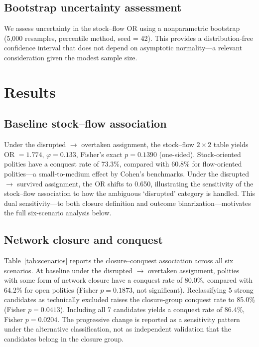 \documentclass[pdflatex,sn-basic]{sn-jnl}
\theoremstyle{thmstyleone}%
\theoremstyle{thmstyletwo}%
\theoremstyle{thmstylethree}%
\begin{document}
\subsection{Bootstrap uncertainty assessment}\label{sec:methods-bootstrap}

We assess uncertainty in the stock--flow OR using a nonparametric bootstrap (5{,}000 resamples, percentile method, seed = 42). This provides a distribution-free confidence interval that does not depend on asymptotic normality---a relevant consideration given the modest sample size.

\section{Results}\label{sec:results}

\subsection{Baseline stock--flow association}\label{sec:results-baseline}

Under the disrupted $\to$ overtaken assignment, the stock--flow $2 \times 2$ table yields OR $= 1.774$, $\varphi = 0.133$, Fisher's exact $p = 0.1390$ (one-sided). Stock-oriented polities have a conquest rate of 73.3\%, compared with 60.8\% for flow-oriented polities---a small-to-medium effect by Cohen's benchmarks. Under the disrupted $\to$ survived assignment, the OR shifts to 0.650, illustrating the sensitivity of the stock--flow association to how the ambiguous `disrupted' category is handled. This dual sensitivity---to both closure definition and outcome binarization---motivates the full six-scenario analysis below.

\subsection{Network closure and conquest}\label{sec:results-closure}

Table~\ref{tab:scenarios} reports the closure--conquest association across all six scenarios. At baseline under the disrupted $\to$ overtaken assignment, polities with some form of network closure have a conquest rate of 80.0\%, compared with 64.2\% for open polities (Fisher $p = 0.1873$, not significant). Reclassifying 5 strong candidates as technically excluded raises the closure-group conquest rate to 85.0\% (Fisher $p = 0.0413$). Including all 7 candidates yields a conquest rate of 86.4\%, Fisher $p = 0.0204$. The progressive change is reported as a sensitivity pattern under the alternative classification, not as independent validation that the candidates belong in the closure group.
\end{document}
